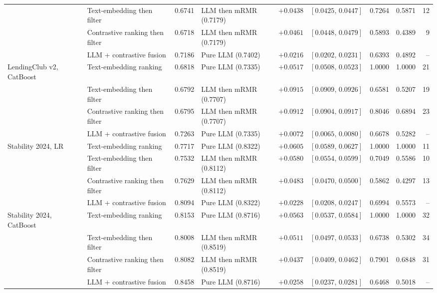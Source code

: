 \documentclass[final,5p,twocolumn]{elsarticle}
\begin{document}
\begin{table}[htbp]
\begin{threeparttable}
\begin{tabular}{@{}llrlrlrrr@{}}
 & Text-embedding then filter & 0.6741 & LLM then mRMR (0.7179) & $+0.0438$ & $[0.0425,\,0.0447]$ & 0.7264 & 0.5871 & 12 \\
 & Contrastive ranking then filter & 0.6718 & LLM then mRMR (0.7179) & $+0.0461$ & $[0.0448,\,0.0479]$ & 0.5893 & 0.4389 & 9 \\
 & LLM + contrastive fusion & 0.7186 & Pure LLM (0.7402) & $+0.0216$ & $[0.0202,\,0.0231]$ & 0.6393 & 0.4892 & -- \\
\addlinespace
LendingClub v2, CatBoost & Text-embedding ranking & 0.6818 & Pure LLM (0.7335) & $+0.0517$ & $[0.0508,\,0.0523]$ & 1.0000 & 1.0000 & 21 \\
 & Text-embedding then filter & 0.6792 & LLM then mRMR (0.7707) & $+0.0915$ & $[0.0909,\,0.0926]$ & 0.6581 & 0.5207 & 19 \\
 & Contrastive ranking then filter & 0.6795 & LLM then mRMR (0.7707) & $+0.0912$ & $[0.0904,\,0.0917]$ & 0.8046 & 0.6894 & 23 \\
 & LLM + contrastive fusion & 0.7263 & Pure LLM (0.7335) & $+0.0072$ & $[0.0065,\,0.0080]$ & 0.6678 & 0.5282 & -- \\
\addlinespace
Stability 2024, LR & Text-embedding ranking & 0.7717 & Pure LLM (0.8322) & $+0.0605$ & $[0.0589,\,0.0627]$ & 1.0000 & 1.0000 & 11 \\
 & Text-embedding then filter & 0.7532 & LLM then mRMR (0.8112) & $+0.0580$ & $[0.0554,\,0.0599]$ & 0.7049 & 0.5586 & 10 \\
 & Contrastive ranking then filter & 0.7629 & LLM then mRMR (0.8112) & $+0.0483$ & $[0.0470,\,0.0500]$ & 0.5862 & 0.4297 & 13 \\
 & LLM + contrastive fusion & 0.8094 & Pure LLM (0.8322) & $+0.0228$ & $[0.0208,\,0.0247]$ & 0.6994 & 0.5573 & -- \\
\addlinespace
Stability 2024, CatBoost & Text-embedding ranking & 0.8153 & Pure LLM (0.8716) & $+0.0563$ & $[0.0537,\,0.0584]$ & 1.0000 & 1.0000 & 32 \\
 & Text-embedding then filter & 0.8008 & LLM then mRMR (0.8519) & $+0.0511$ & $[0.0497,\,0.0533]$ & 0.6738 & 0.5302 & 34 \\
 & Contrastive ranking then filter & 0.8082 & LLM then mRMR (0.8519) & $+0.0437$ & $[0.0409,\,0.0462]$ & 0.7901 & 0.6848 & 31 \\
 & LLM + contrastive fusion & 0.8458 & Pure LLM (0.8716) & $+0.0258$ & $[0.0237,\,0.0281]$ & 0.6468 & 0.5018 & -- \\
\bottomrule
\end{tabular}
\end{threeparttable}
\end{table}
\end{document}
